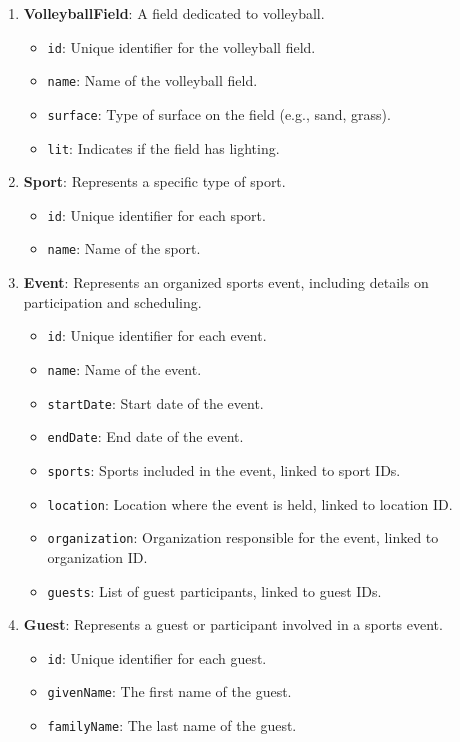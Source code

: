\begin{enumerate}
    \item \textbf{VolleyballField}: A field dedicated to volleyball.
    \begin{itemize}
        \item \texttt{id}: Unique identifier for the volleyball field.
        \item \texttt{name}: Name of the volleyball field.
        \item \texttt{surface}: Type of surface on the field (e.g., sand, grass).
        \item \texttt{lit}: Indicates if the field has lighting.
    \end{itemize}

    \item \textbf{Sport}: Represents a specific type of sport.
    \begin{itemize}
        \item \texttt{id}: Unique identifier for each sport.
        \item \texttt{name}: Name of the sport.
    \end{itemize}

    \item \textbf{Event}: Represents an organized sports event, including details on participation and scheduling.
    \begin{itemize}
        \item \texttt{id}: Unique identifier for each event.
        \item \texttt{name}: Name of the event.
        \item \texttt{startDate}: Start date of the event.
        \item \texttt{endDate}: End date of the event.
        \item \texttt{sports}: Sports included in the event, linked to sport IDs.
        \item \texttt{location}: Location where the event is held, linked to location ID.
        \item \texttt{organization}: Organization responsible for the event, linked to organization ID.
        \item \texttt{guests}: List of guest participants, linked to guest IDs.
    \end{itemize}

    \item \textbf{Guest}: Represents a guest or participant involved in a sports event.
    \begin{itemize}
        \item \texttt{id}: Unique identifier for each guest.
        \item \texttt{givenName}: The first name of the guest.
        \item \texttt{familyName}: The last name of the guest.
    \end{itemize}


\end{enumerate}
